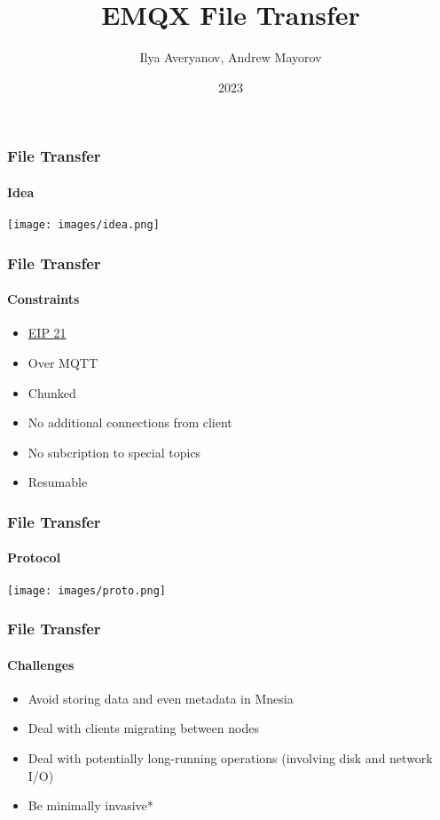 \documentclass{beamer}
\title{EMQX File Transfer}
\author{Ilya Averyanov, Andrew Mayorov}
\institute{EMQX}
\date{2023}
\begin{document}
\frame{\titlepage}

\begin{frame}
    \frametitle{File Transfer}
    \framesubtitle{Idea}

    \begin{center}
        \texttt{[image: images/idea.png]}
    \end{center}
\end{frame}

\begin{frame}
    \frametitle{File Transfer}
    \framesubtitle{Constraints}

    \begin{center}
        \begin{itemize}
            \item \href{https://github.com/emqx/eip/blob/main/active/0021-transfer-files-over-mqtt.md}{EIP 21}
            \item Over MQTT
            \item Chunked
            \item No additional connections from client
            \item No subcription to special topics
            \item Resumable
        \end{itemize}
    \end{center}
\end{frame}

\begin{frame}
    \frametitle{File Transfer}
    \framesubtitle{Protocol}

    \begin{center}
        \texttt{[image: images/proto.png]}
    \end{center}
\end{frame}

\begin{frame}
    \frametitle{File Transfer}
    \framesubtitle{Challenges}

    \begin{center}
        \begin{itemize}
            \item Avoid storing data and even metadata in Mnesia
            \item Deal with clients migrating between nodes
            \item Deal with potentially long-running operations (involving disk and network I/O)
            \item Be minimally invasive*
        \end{itemize}
    \end{center}
\end{frame}
\end{document}
